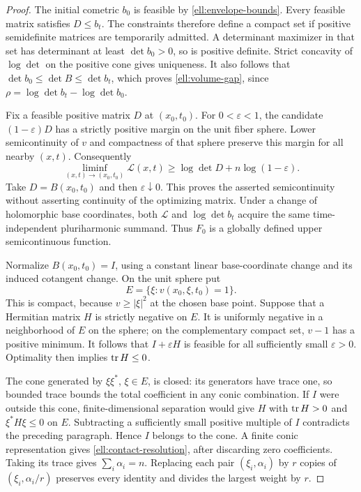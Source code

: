 \begin{proof}
The initial cometric $b_0$ is feasible by
\eqref{ell:envelope-bounds}.  Every feasible matrix satisfies $D\le b_t$.
The constraints therefore define a compact set if positive semidefinite
matrices are temporarily admitted.  A determinant maximizer in that set
has determinant at least $\det b_0>0$, so is positive definite.
Strict concavity of $\log\det$ on the positive cone gives uniqueness.
It also follows that $\det b_0\le\det B\le\det b_t$, which proves
\eqref{ell:volume-gap}, since
$\rho=\log\det b_t-\log\det b_0$.

Fix a feasible positive matrix $D$ at $(x_0,t_0)$.  For $0<\varepsilon<1$,
the candidate $(1-\varepsilon)D$ has a strictly positive margin on the
unit fiber sphere.  Lower semicontinuity of $v$ and compactness of that
sphere preserve this margin for all nearby $(x,t)$.  Consequently
\[
 \liminf_{(x,t)\to(x_0,t_0)}\mathcal L(x,t)
 \ge\log\det D+n\log(1-\varepsilon).
\]
Take $D=B(x_0,t_0)$ and then $\varepsilon\downarrow0$.
This proves the asserted semicontinuity without asserting continuity of
the optimizing matrix.  Under a change of holomorphic base coordinates,
both $\mathcal L$ and $\log\det b_t$ acquire the same time-independent
pluriharmonic summand.  Thus $F_0$ is a globally defined upper
semicontinuous function.

Normalize $B(x_0,t_0)=I$, using a constant linear base-coordinate change
and its induced cotangent change.  On the unit sphere put
\[
 E=\{\xi:v(x_0,\xi,t_0)=1\}.
\]
This is compact, because $v\ge|\xi|^2$ at the chosen base point.
Suppose that a Hermitian matrix $H$ is strictly negative on $E$.
It is uniformly negative in a neighborhood of $E$ on the sphere;
on the complementary compact set, $v-1$ has a positive minimum.
It follows that $I+\varepsilon H$ is feasible for all sufficiently
small $\varepsilon>0$.  Optimality then implies $\operatorname{tr} H\le0$.

The cone generated by $\xi\xi^*$, $\xi\in E$, is closed: its generators
have trace one, so bounded trace bounds the total coefficient in any
conic combination.  If $I$ were outside this cone, finite-dimensional
separation would give $H$ with $\operatorname{tr} H>0$ and $\xi^*H\xi\le0$ on $E$.
Subtracting a sufficiently small positive multiple of $I$ contradicts
the preceding paragraph.  Hence $I$ belongs to the cone.  A finite
conic representation gives \eqref{ell:contact-resolution}, after
discarding zero coefficients.  Taking its trace gives $\sum_i\alpha_i=n$.
Replacing each pair $(\xi_i,\alpha_i)$ by $r$ copies of
$(\xi_i,\alpha_i/r)$ preserves every identity and divides the largest
weight by $r$.
\end{proof}

